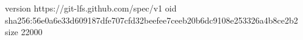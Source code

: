 version https://git-lfs.github.com/spec/v1
oid sha256:56e0a6e33d609187dfe707cfd32beefee7ceeb20b6dc9108e253326a4b8ce2b2
size 22000
